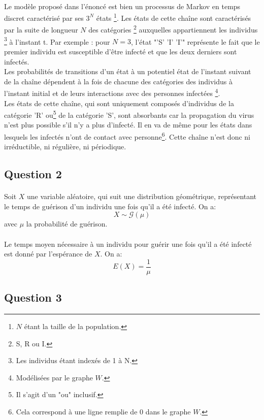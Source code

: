 \documentclass[a4paper, 12pt, oneside]{article}
\begin{document}
\paragraph{}Le modèle proposé dans l'énoncé est bien un processus de Markov en temps discret caractérisé par ses $3^N$ états \footnote{$N$ étant la taille de la population.}. Les états de cette chaîne sont caractérisés par la suite de longueur $N$ des catégories \footnote{S, R ou I.} auxquelles appartiennent les individus \footnote{Les individus étant indexés de 1 à N.} à l'instant t. Par exemple : pour $N = 3$, l'état "'S' 'I' 'I'" représente le fait que le premier individu est susceptible d'être infecté et que les deux derniers sont infectés.\\
\indent Les probabilités de transitions d'un état à un potentiel état de l'instant suivant de la chaîne dépendent à la fois de chacune des catégories des individus à l'instant initial et de leurs interactions avec des personnes infectées \footnote{Modélisées par le graphe $W$.}.\\
\indent Les états de cette chaîne, qui sont uniquement composés d'individus de la catégorie 'R' ou\footnote{Il s'agit d'un "ou" inclusif.} de la catégorie 'S', sont absorbants car la propagation du virus n'est plus possible s'il n'y a plus d'infecté. Il en va de même pour les états dans lesquels les infectés n'ont de contact avec personne\footnote{Cela correspond à une ligne remplie de 0 dans le graphe $W$.}. Cette chaîne n'est donc ni irréductible, ni régulière, ni périodique.

\subsection{Question 2}

\paragraph{}Soit $X$ une variable aléatoire, qui suit une distribution géométrique, représentant le temps de guérison d'un individu une fois qu'il a été infecté. On a: $$X \sim \mathcal{G}(\mu)$$ avec $\mu$ la probabilité de guérison.
\paragraph{}Le temps moyen nécessaire à un individu pour guérir une fois qu'il a été infecté est donné par l'espérance de $X$. On a: $$E(X) = \frac{1}{\mu}$$

\subsection{Question 3}
\end{document}
